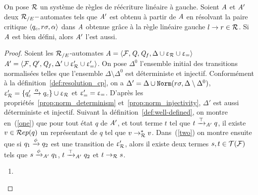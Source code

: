 \begin{lemma}
  \label{lemma:C-well-defined}
  On pose $\mathcal R$ un système de règles de réécriture linéaire à gauche.
  Soient $\mathit A$ et $\mathit A'$ deux ${\mathcal R_{/E}}-$automates tels que 
  $\mathit A'$ est obtenu à partir de $\mathit A$ en résolvant 
  la paire critique $\langle q_c, r\sigma,\alpha \rangle$ dans $\mathit A$
  obtenue grâce à la règle linéaire gauche $l\rightarrow r\in \mathcal R$.
  Si $\mathit A$ est bien défini, alors $\mathit A'$ l'est aussi. 
\end{lemma}
\begin{proof}
  Soient les ${\mathcal R_{/E}}$-automates $\mathit A=\langle \mathcal{F}, \mathit Q, \mathit Q_f, \Delta\cup \upvarepsilon_{\mathcal R}\cup \upvarepsilon_{=}\rangle$ 
  $\mathit A'=\langle \mathcal{F}, \mathit Q', \mathit Q_f, \Delta'\cup \upvarepsilon_{\mathcal R}'\cup \upvarepsilon_{=}' \rangle$. On pose $\Delta^0$ l'ensemble initial
  des transitions normalisées telles que l'ensemble $\Delta\setminus\Delta^0$
  est déterministe et injectif.
 Conformément à la définition~\ref{def:resolution_cp}, on a $\Delta'=\Delta \cup
  \mathtt{Norm}(r\sigma, \Delta\setminus \Delta^0)$, $\upvarepsilon_{\mathcal R}'= \{
  q'_c\xrightarrow{\alpha} q_c\}\cup \upvarepsilon_{\mathcal R}$ et $\upvarepsilon_{=}'=\upvarepsilon_{=}$. D'après les propriétés~\ref{prop:norm_determinism} et~\ref{prop:norm_injectivity},
  $\Delta'$ est aussi déterministe et injectif. Suivant la définition~\ref{def:well-defined}, on montre en~(\ref{one}) que 
  pour tout état $q$ de $\mathit A'$, et tout terme $t$ tel que $t \xrightarrow{\top}_{\mathit A'} q$, il existe $v \in \mathcal R ep(q)$ un représentant de $q$ 
  tel que $v \rightarrow^*_\mathcal R v$. Dans~(\ref{two}) on montre ensuite que si $q_1 \xrightarrow{\phi} q_2$ est une transition de $\upvarepsilon_{\mathcal R}'$, alors il 
  existe deux termes $s,t\in \mathcal{T(F)}$ tels que $s\xrightarrow{\phi}_{\mathit A'} q_1$, $t\xrightarrow{\top}_{\mathit A'} q_2$ et $t \rightarrow_\mathcal R s$.
\medskip
  
\begin{enumerate}
\item \label{one} 



  \newcommand{\xrwa}{\xrw{\top}_\A}
  \newcommand{\xrwap}{\xrw{\top}_{\A'}}


\end{enumerate}
\end{proof}
